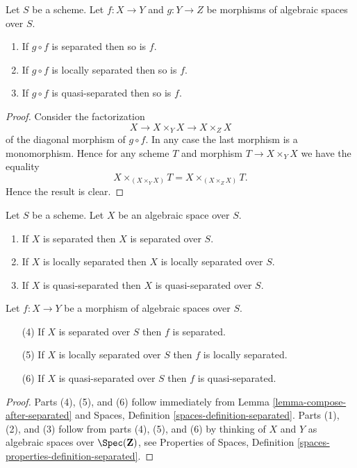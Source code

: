 \begin{lemma}
\label{lemma-compose-after-separated}
Let $S$ be a scheme.
Let $f : X \to Y$ and $g : Y \to Z$ be morphisms of algebraic spaces over $S$.
\begin{enumerate}
\item If $g \circ f$ is separated then so is $f$.
\item If $g \circ f$ is locally separated then so is $f$.
\item If $g \circ f$ is quasi-separated then so is $f$.
\end{enumerate}
\end{lemma}

\begin{proof}
Consider the factorization
$$
X \to X \times_Y X \to X \times_Z X
$$
of the diagonal morphism of $g \circ f$. In any case the last morphism
is a monomorphism. Hence for any scheme $T$ and morphism
$T \to X \times_Y X$ we have the equality
$$
X \times_{(X \times_Y X)} T = X \times_{(X \times_Z X)} T.
$$
Hence the result is clear.
\end{proof}

\begin{lemma}
\label{lemma-separated-implies-morphism-separated}
Let $S$ be a scheme. Let $X$ be an algebraic space over $S$.
\begin{enumerate}
\item If $X$ is separated then $X$ is separated over $S$.
\item If $X$ is locally separated then $X$ is locally separated over $S$.
\item If $X$ is quasi-separated then $X$ is quasi-separated over $S$.
\end{enumerate}
Let $f : X \to Y$ be a morphism of algebraic spaces over $S$.
\begin{enumerate}
\item[(4)] If $X$ is separated over $S$ then $f$ is separated.
\item[(5)] If $X$ is locally separated over $S$ then $f$ is locally separated.
\item[(6)] If $X$ is quasi-separated over $S$ then $f$ is quasi-separated.
\end{enumerate}
\end{lemma}

\begin{proof}
Parts (4), (5), and (6) follow immediately from
Lemma \ref{lemma-compose-after-separated}
and
Spaces, Definition \ref{spaces-definition-separated}.
Parts (1), (2), and (3) follow from parts (4), (5), and (6) by
thinking of $X$ and $Y$ as algebraic spaces over
$\Spec(\mathbf{Z})$, see
Properties of Spaces, Definition \ref{spaces-properties-definition-separated}.
\end{proof}

